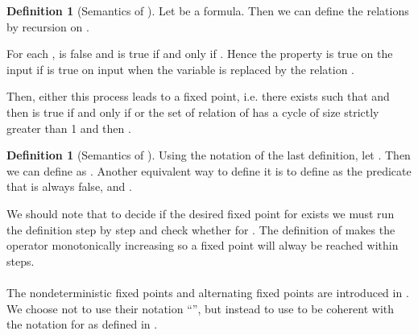 \documentclass[a4paper,12pt]{article}
\theoremstyle{definition}
\newtheorem{definition}[theorem]{Definition}
\begin{document}
\begin{definition}[Semantics of \PFP]
  Let  be a formula. Then we can
  define the relations  by recursion on .

  For each ,  is false and
   is true if and only if . Hence the property  is true on
  the input  if  is true on input  when the
  variable  is replaced by the relation .

  Then, either this process leads to a fixed point, i.e. there exists
   such that  and then  is true if and only if  or the set of
  relation of  has a cycle of size strictly greater than 1 and
  then .
\end{definition}

\begin{definition}[Semantics of \IFP]
  Using the notation of the last definition, let . Then we can define
   as . Another equivalent way to define it is to define  as the
  predicate that is always false, and .
\end{definition}

We should note that to decide if the desired fixed point for  exists we
must run the definition step by step and check whether  for .  The
definition of \IFP{} makes the operator monotonically increasing so a
fixed point will alway be reached within  steps.

\paragraph{}
The nondeterministic fixed points and alternating fixed points are
introduced in \cite{nfp}. We choose not to use their notation
``'', but instead to use
 to be coherent
with the notation for  as defined in \cite{imm}.
\end{document}
